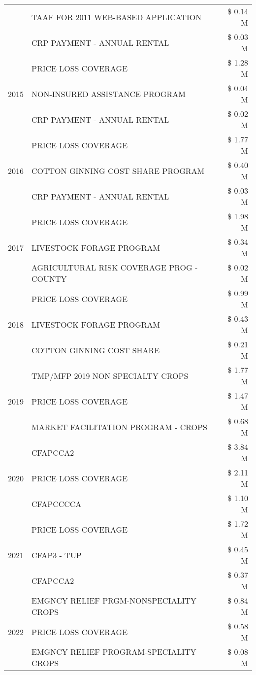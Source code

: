 \begin{tabular}{llr}
 & TAAF FOR 2011 WEB-BASED APPLICATION & \$ 0.14 M \\
 & CRP PAYMENT - ANNUAL RENTAL & \$ 0.03 M \\
\cline{1-3}
\multirow[t]{3}{*}{2015} & PRICE LOSS COVERAGE & \$ 1.28 M \\
 & NON-INSURED ASSISTANCE PROGRAM & \$ 0.04 M \\
 & CRP PAYMENT - ANNUAL RENTAL & \$ 0.02 M \\
\cline{1-3}
\multirow[t]{3}{*}{2016} & PRICE LOSS COVERAGE & \$ 1.77 M \\
 & COTTON GINNING COST SHARE PROGRAM & \$ 0.40 M \\
 & CRP PAYMENT - ANNUAL RENTAL & \$ 0.03 M \\
\cline{1-3}
\multirow[t]{3}{*}{2017} & PRICE LOSS COVERAGE & \$ 1.98 M \\
 & LIVESTOCK FORAGE PROGRAM & \$ 0.34 M \\
 & AGRICULTURAL RISK COVERAGE PROG - COUNTY & \$ 0.02 M \\
\cline{1-3}
\multirow[t]{3}{*}{2018} & PRICE LOSS COVERAGE & \$ 0.99 M \\
 & LIVESTOCK FORAGE PROGRAM & \$ 0.43 M \\
 & COTTON GINNING COST SHARE & \$ 0.21 M \\
\cline{1-3}
\multirow[t]{3}{*}{2019} & TMP/MFP 2019 NON SPECIALTY CROPS & \$ 1.77 M \\
 & PRICE LOSS COVERAGE & \$ 1.47 M \\
 & MARKET FACILITATION PROGRAM - CROPS & \$ 0.68 M \\
\cline{1-3}
\multirow[t]{3}{*}{2020} & CFAPCCA2 & \$ 3.84 M \\
 & PRICE LOSS COVERAGE & \$ 2.11 M \\
 & CFAPCCCCA & \$ 1.10 M \\
\cline{1-3}
\multirow[t]{3}{*}{2021} & PRICE LOSS COVERAGE & \$ 1.72 M \\
 & CFAP3 - TUP & \$ 0.45 M \\
 & CFAPCCA2 & \$ 0.37 M \\
\cline{1-3}
\multirow[t]{3}{*}{2022} & EMGNCY RELIEF PRGM-NONSPECIALITY CROPS & \$ 0.84 M \\
 & PRICE LOSS COVERAGE & \$ 0.58 M \\
 & EMGNCY RELIEF PROGRAM-SPECIALITY CROPS & \$ 0.08 M \\
\cline{1-3}
\bottomrule
\end{tabular}
